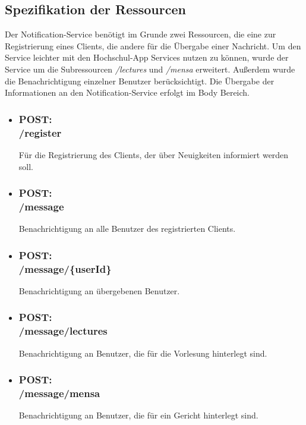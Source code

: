 \subsection*{Spezifikation der Ressourcen}
\label{sec:notification_api}
Der Notification-Service benötigt im Grunde zwei Ressourcen, die eine zur Registrierung eines Clients, die andere für die Übergabe einer Nachricht. Um den Service leichter mit den Hochschul-\ac{App} Services nutzen zu können, wurde der Service um die Subressourcen \textit{/lectures} und \textit{/mensa} erweitert. Außerdem wurde die Benachrichtigung einzelner Benutzer berücksichtigt. Die Übergabe der Informationen an den Notification-Service erfolgt im Body Bereich. 
\begin{itemize}
\item \subsubsection{POST: \\/register} 
Für die Registrierung des Clients, der über Neuigkeiten informiert werden soll.
\item \subsubsection{POST: \\/message} 
Benachrichtigung an alle Benutzer des registrierten Clients.
\item \subsubsection{POST: \\/message/\{userId\}} 
Benachrichtigung an übergebenen Benutzer.
\item \subsubsection{POST: \\/message/lectures} 
Benachrichtigung an Benutzer, die für die Vorlesung hinterlegt sind.
\item \subsubsection{POST: \\/message/mensa} 
Benachrichtigung an Benutzer, die für ein Gericht hinterlegt sind.
\end{itemize}

